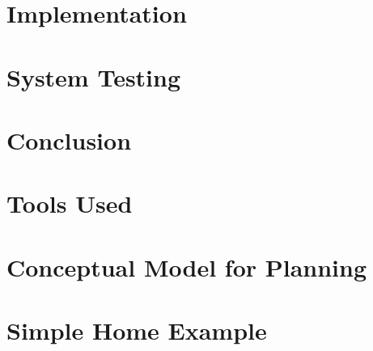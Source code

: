 \documentclass{report}
\begin{document}
\chapter{Implementation}


\chapter{System Testing}


\chapter{Conclusion}


\begin{appendices}
  \chapter{Tools Used}
  

  \chapter{Conceptual Model for Planning}
  \label{appendix:dynamic-planning}
  


  \chapter{Simple Home Example}
  \label{appendix:home-example}
  
\end{appendices}



\end{document}

